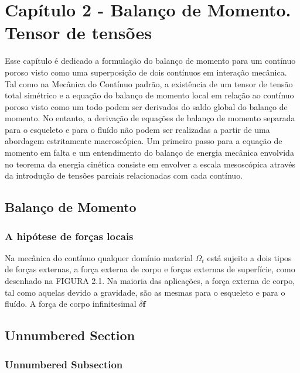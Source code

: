 \documentclass[
	11pt, %
	fleqn, %
	a4paper, %
]{LegrandOrangeBook}
\begin{document}
\chapter{Capítulo 2 - Balanço de Momento. Tensor de tensões}

Esse capítulo é dedicado a formulação do balanço de momento para um contínuo poroso visto como uma superposição de dois contínuos em interação mecânica. Tal como na Mecânica do Contínuo padrão, a existência de um tensor de tensão total simétrico e a equação do balanço de momento local em relação ao contínuo poroso visto como um todo podem ser derivados do saldo global do balanço de momento. No entanto, a derivação de equações de balanço de momento separada para o esqueleto e para o fluído não podem ser realizadas a partir de uma abordagem estritamente macroscópica. Um primeiro passo para a equação de momento em falta e um entendimento do balanço de energia mecânica envolvida no teorema da energia cinética consiste em envolver a escala mesoscópica através da introdução de tensões parciais relacionadas com cada contínuo.

\section{Balanço de Momento}

\newcommand{\fl}{\textbf{f}}

\subsection{A hipótese de forças locais}

Na mecânica do contínuo qualquer domínio material $\Omega_t$ está sujeito a dois tipos de forças externas, a força externa de corpo e forças externas de superfície, como desenhado na FIGURA 2.1. Na maioria das aplicações, a força externa de corpo, tal como aquelas devido a gravidade, são as mesmas para o esqueleto e para o fluído. A força de corpo infinitesimal $\delta \fl$



\newpage


\section*{Unnumbered Section}

\subsection*{Unnumbered Subsection}
\end{document}
